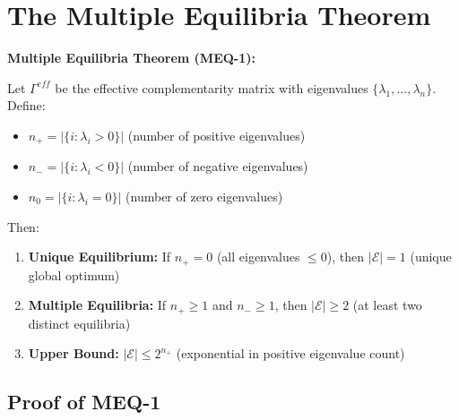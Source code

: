 \section{The Multiple Equilibria Theorem}
\label{sec:meq-theorem}

\begin{tcolorbox}[colback=red!5!white, colframe=red!75!black,
    title=Theorem MEQ-1: Existence of Multiple Equilibria]

\textbf{Multiple Equilibria Theorem (MEQ-1):}

Let $\Gamma^{eff}$ be the effective complementarity matrix with eigenvalues
$\{\lambda_1, ..., \lambda_n\}$. Define:
\begin{itemize}[nosep]
    \item $n_+ = |\{i : \lambda_i > 0\}|$ (number of positive eigenvalues)
    \item $n_- = |\{i : \lambda_i < 0\}|$ (number of negative eigenvalues)
    \item $n_0 = |\{i : \lambda_i = 0\}|$ (number of zero eigenvalues)
\end{itemize}

Then:

\begin{enumerate}
    \item \textbf{Unique Equilibrium:} If $n_+ = 0$ (all eigenvalues $\leq 0$),
          then $|\mathcal{E}| = 1$ (unique global optimum)

    \item \textbf{Multiple Equilibria:} If $n_+ \geq 1$ and $n_- \geq 1$, then
          $|\mathcal{E}| \geq 2$ (at least two distinct equilibria)

    \item \textbf{Upper Bound:} $|\mathcal{E}| \leq 2^{n_+}$ (exponential in
          positive eigenvalue count)
\end{enumerate}

\end{tcolorbox}

\subsection{Proof of MEQ-1}

